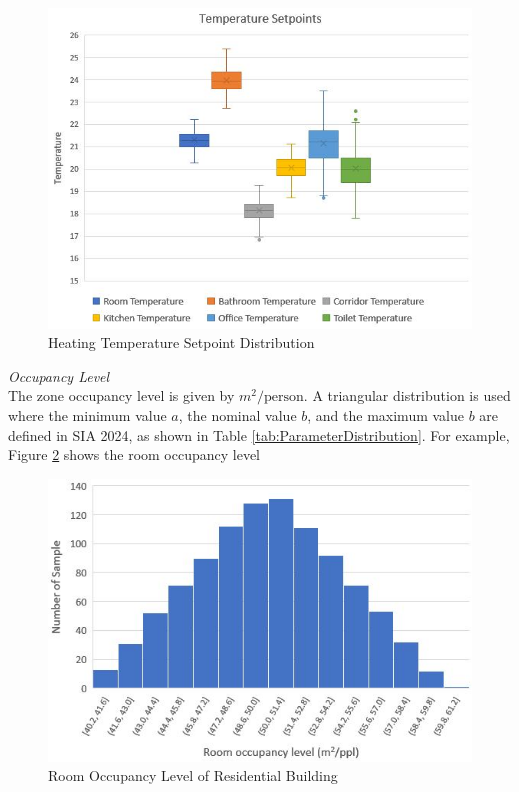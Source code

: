 \documentclass[a4paper, oneside]{discothesis}
\begin{document}
			\begin{figure}[H]
			\centering
			\includegraphics[scale=0.85]{Residential_TempSetpoint.jpg}
			\caption{Heating Temperature Setpoint Distribution}
			\label{fig:TempSetpoint}
			\end{figure}
		
		\textit{Occupancy Level}\\
			The zone occupancy level is given by $m^2/\text{person}$. A triangular distribution is used where the minimum value $a$, the nominal value $b$, and the maximum value $b$ are defined in SIA 2024, as shown in Table \ref{tab:ParameterDistribution}. For example, Figure \ref{fig:HonggRoomOcc} shows the room occupancy level

			\begin{figure}[h!]
			\centering
			\includegraphics[scale=0.9]{figures/RoomOccupancy.JPG}
			\caption{Room Occupancy Level of Residential Building}
			\label{fig:HonggRoomOcc}
			\end{figure}
			
\end{document}
